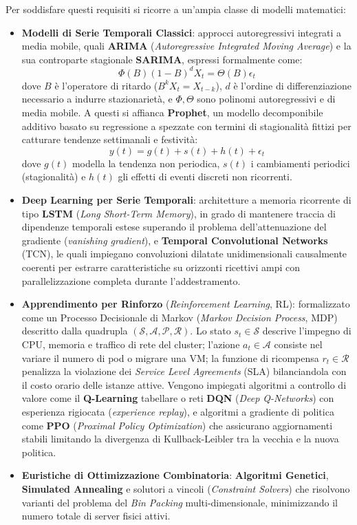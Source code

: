 \documentclass[11pt, a4paper]{article}
\begin{document}
Per soddisfare questi requisiti si ricorre a un'ampia classe di modelli matematici:
\begin{itemize}
    \item \textbf{Modelli di Serie Temporali Classici}: approcci autoregressivi integrati a media mobile, quali \textbf{ARIMA} (\emph{Autoregressive Integrated Moving Average}) e la sua controparte stagionale \textbf{SARIMA}, espressi formalmente come:
    \begin{equation}
        \Phi(B) (1 - B)^d X_t = \Theta(B) \epsilon_t
    \end{equation}
    dove $B$ è l'operatore di ritardo ($B^k X_t = X_{t-k}$), $d$ è l'ordine di differenziazione necessario a indurre stazionarietà, e $\Phi, \Theta$ sono polinomi autoregressivi e di media mobile. A questi si affianca \textbf{Prophet}, un modello decomponibile additivo basato su regressione a spezzate con termini di stagionalità fittizi per catturare tendenze settimanali e festività:
    \begin{equation}
        y(t) = g(t) + s(t) + h(t) + \epsilon_t
    \end{equation}
    dove $g(t)$ modella la tendenza non periodica, $s(t)$ i cambiamenti periodici (stagionalità) e $h(t)$ gli effetti di eventi discreti non ricorrenti.
    \item \textbf{Deep Learning per Serie Temporali}: architetture a memoria ricorrente di tipo \textbf{LSTM} (\emph{Long Short-Term Memory}), in grado di mantenere traccia di dipendenze temporali estese superando il problema dell'attenuazione del gradiente (\emph{vanishing gradient}), e \textbf{Temporal Convolutional Networks} (TCN), le quali impiegano convoluzioni dilatate unidimensionali causalmente coerenti per estrarre caratteristiche su orizzonti ricettivi ampi con parallelizzazione completa durante l'addestramento.
    \item \textbf{Apprendimento per Rinforzo} (\emph{Reinforcement Learning}, RL): formalizzato come un Processo Decisionale di Markov (\emph{Markov Decision Process}, MDP) descritto dalla quadrupla $(\mathcal{S}, \mathcal{A}, \mathcal{P}, \mathcal{R})$. Lo stato $s_t \in \mathcal{S}$ descrive l'impegno di CPU, memoria e traffico di rete del cluster; l'azione $a_t \in \mathcal{A}$ consiste nel variare il numero di pod o migrare una VM; la funzione di ricompensa $r_t \in \mathcal{R}$ penalizza la violazione dei \emph{Service Level Agreements} (SLA) bilanciandola con il costo orario delle istanze attive. Vengono impiegati algoritmi a controllo di valore come il \textbf{Q-Learning} tabellare o reti \textbf{DQN} (\emph{Deep Q-Networks}) con esperienza rigiocata (\emph{experience replay}), e algoritmi a gradiente di politica come \textbf{PPO} (\emph{Proximal Policy Optimization}) che assicurano aggiornamenti stabili limitando la divergenza di Kullback-Leibler tra la vecchia e la nuova politica.
    \item \textbf{Euristiche di Ottimizzazione Combinatoria}: \textbf{Algoritmi Genetici}, \textbf{Simulated Annealing} e solutori a vincoli (\emph{Constraint Solvers}) che risolvono varianti del problema del \emph{Bin Packing} multi-dimensionale, minimizzando il numero totale di server fisici attivi.
\end{itemize}
\end{document}

